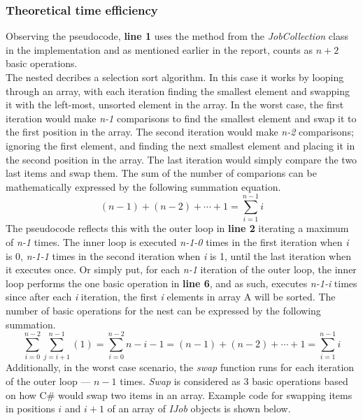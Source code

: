 \documentclass[a4paper]{article}
\begin{document}
\subsubsection{Theoretical time efficiency}
Observing the pseudocode, \textbf{line 1} uses the  method from the \textit{JobCollection} class in the implementation and as mentioned earlier in the report, counts as \textbf{$n+2$} basic operations. 
\\[3pt]
\noindent
The nested  decribes a selection sort algorithm. In this case it works by looping through an array, with each iteration finding the smallest element and swapping it with the left-most, unsorted element in the array. In the worst case, the first iteration would make \textit{n-1} comparisons to find the smallest element and swap it to the first position in the array. The second iteration would make \textit{n-2} comparisons; ignoring the first element, and finding the next smallest element and placing it in the second position in the array. The last iteration would simply compare the two last items and swap them. The sum of the number of comparions can be mathematically expressed by the following summation equation.
\[ 
   (n-1)+(n-2)+\cdots+1 = \sum^{n-1}_{i=1}{i}
\]
\noindent
The pseudocode reflects this with the outer loop in \textbf{line 2} iterating a maximum of \textit{n-1} times. The inner loop is  executed \textit{n-1-0} times in the first iteration when \textit{i} is $0$, \textit{n-1-1} times in the second iteration when \textit{i} is 1, until the last iteration when it executes once. Or simply put, for each \textit{n-1} iteration of the outer loop, the inner loop performs the one basic operation in \textbf{line 6}, and as such, executes \textit{n-1-i} times since after each \textit{i} iteration, the first \textit{i} elements in array A will be sorted. The number of basic operations for the nest  can be expressed by the following summation.
\[ 
   \sum^{n-2}_{i=0} \sum^{n-1}_{j=i+1}(1) = \sum^{n-2}_{i=0}{n-i-1} = (n-1)+(n-2)+\cdots+1 
   = \sum^{n-1}_{i=1}{i}
\]
\noindent
Additionally, in the worst case scenario, the \textit{swap} function runs for each iteration of the outer loop --- $n-1$ times. \textit{Swap} is considered as 3 basic operations based on how C\# would swap two items in an array. Example code for swapping items in positions $i$ and $i+1$ of an array of \textit{IJob} objects is shown below.
\begin{flushleft}
   \\
   \\
\end{flushleft}
\end{document}

